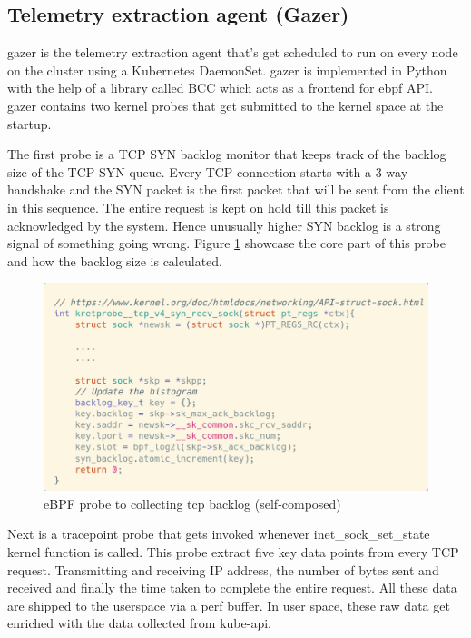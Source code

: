 \subsection{Telemetry extraction agent (Gazer)}

\ac{gazer} is the telemetry extraction agent that's get scheduled to run on every node on the cluster using a Kubernetes DaemonSet. \ac{gazer} is implemented in Python with the help of a library called BCC which acts as a frontend for \ac{ebpf} API. \ac{gazer} contains two kernel probes that get submitted to the kernel space at the startup. 

The first probe is a TCP SYN backlog monitor that keeps track of the backlog size of the TCP SYN queue. Every TCP connection starts with a 3-way handshake and the SYN packet is the first packet that will be sent from the client in this sequence. The entire request is kept on hold till this packet is acknowledged by the system. Hence unusually higher SYN backlog is a strong signal of something going wrong. Figure \ref{fig:backlog-probe} showcase the core part of this probe and how the backlog size is calculated.

\begin{figure}[H]
    \includegraphics[width=14cm]{assets/implementation/backlog-probe.png}
    \caption{eBPF probe to collecting tcp backlog (self-composed)}
    \label{fig:backlog-probe}
\end{figure}

Next is a tracepoint probe that gets invoked whenever inet\_sock\_set\_state kernel function is called. This probe extract five key data points from every TCP request. Transmitting and receiving IP address, the number of bytes sent and received and finally the time taken to complete the entire request. All these data are shipped to the userspace via a perf buffer. In user space, these raw data get enriched with the data collected from kube-api. 

